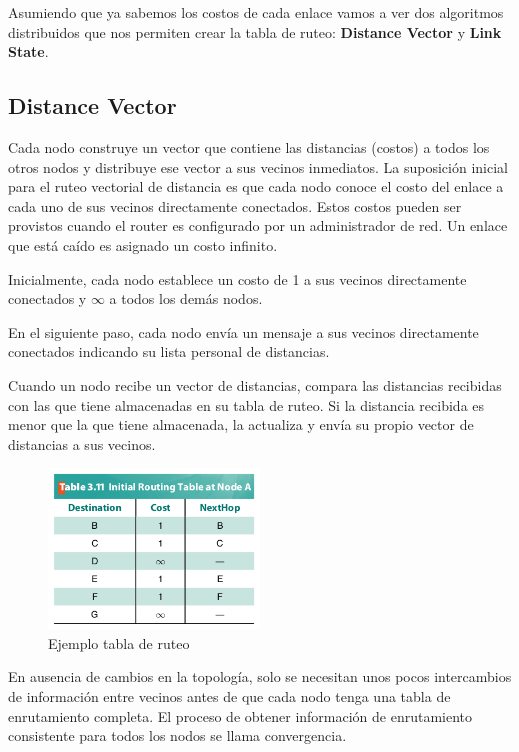 Asumiendo que ya sabemos los costos de cada enlace vamos a ver dos algoritmos distribuidos que nos permiten crear la tabla de ruteo: \textbf{Distance Vector} y \textbf{Link State}.

\subsection{Distance Vector}
Cada nodo construye un vector que contiene las distancias (costos) a todos los otros nodos y distribuye ese vector a sus vecinos inmediatos. La suposición inicial para el ruteo vectorial de distancia es que cada nodo conoce el costo del enlace a cada uno de sus vecinos directamente conectados. Estos costos pueden ser provistos cuando el router es configurado por un administrador de red. Un enlace que está caído es asignado un costo infinito.

Inicialmente, cada nodo establece un costo de 1 a sus vecinos directamente conectados y \(\infty\) a todos los demás nodos.

En el siguiente paso, cada nodo envía un mensaje a sus vecinos directamente conectados indicando su lista personal de distancias.

Cuando un nodo recibe un vector de distancias, compara las distancias recibidas con las que tiene almacenadas en su tabla de ruteo. Si la distancia recibida es menor que la que tiene almacenada, la actualiza y envía su propio vector de distancias a sus vecinos.
\begin{figure}[H]
	\centering
	\includegraphics[width=0.5\textwidth
]{images/distance-vector-routing-table.png}
	\caption[Ejemplo tabla de ruteo]{Ejemplo tabla de ruteo}
	\label{fig:distance-vector-routing-table}
\end{figure}

En ausencia de cambios en la topología, solo se necesitan unos pocos intercambios de información entre vecinos antes de que cada nodo tenga una tabla de enrutamiento completa. El proceso de obtener información de enrutamiento consistente para todos los nodos se llama convergencia.

